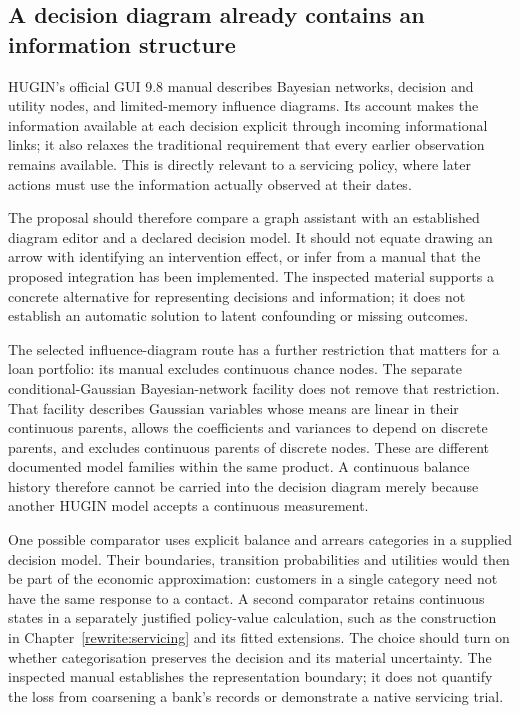 \subsection{A decision diagram already contains an information structure}
HUGIN's official GUI 9.8 manual describes Bayesian networks, decision and
utility nodes, and limited-memory influence diagrams. Its account makes
the information available at each decision explicit through incoming
informational links; it also relaxes the traditional requirement that every
earlier observation remains available. This is directly relevant to a
servicing policy, where later actions must use the information actually
observed at their dates. \citep{gap29hugin}

The proposal should therefore compare a graph assistant with an established
diagram editor and a declared decision model. It should not equate drawing
an arrow with identifying an intervention effect, or infer from a manual
that the proposed integration has been implemented. The inspected material
supports a concrete alternative for representing decisions and information;
it does not establish an automatic solution to latent confounding or missing
outcomes.

The selected influence-diagram route has a further restriction that matters
for a loan portfolio: its manual excludes continuous chance nodes. The
separate conditional-Gaussian Bayesian-network facility does not remove
that restriction. That facility describes Gaussian variables whose means
are linear in their continuous parents, allows the coefficients and variances
to depend on discrete parents, and excludes continuous parents of discrete
nodes. These are different documented model families within the same
product. A continuous balance history therefore cannot be carried into the
decision diagram merely because another HUGIN model accepts a continuous
measurement. \citep{gap29hugin}

One possible comparator uses explicit balance and arrears categories in a
supplied decision model. Their boundaries, transition probabilities and
utilities would then be part of the economic approximation: customers in a
single category need not have the same response to a contact. A second
comparator retains continuous states in a separately justified policy-value
calculation, such as the construction in Chapter~\ref{rewrite:servicing} and
its fitted extensions. The choice should turn on whether categorisation
preserves the decision and its material uncertainty. The inspected manual
establishes the representation boundary; it does not quantify the loss from
coarsening a bank's records or demonstrate a native servicing trial.

